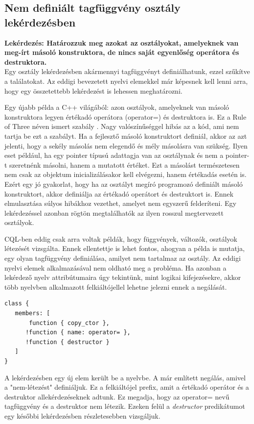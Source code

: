 \documentclass[a4paper,12pt]{report}
\begin{document}
\subsection{Nem definiált tagfüggvény osztály lekérdezésben}
\textbf{Lekérdezés: Határozzuk meg azokat az osztályokat, amelyeknek van meg-írt másoló konstruktora, de nincs saját egyenlőség operátora és destruktora.}
\\
Egy osztály lekérdezésben akármennyi tagfüggvényt definiálhatunk, ezzel szűkítve a találatokat. Az eddigi bevezetett nyelvi elemekkel már képesnek kell lenni arra, hogy egy összetettebb lekérdezést is lehessen meghatározni.
\par Egy újabb példa a C++ világából: azon osztályok, amelyeknek van másoló konstruktora legyen értékadó operátora (operator=) és destruktora is. Ez a Rule of Three néven ismert szabály \cite{rule_of_three}. Nagy valószínűséggel hibás az a kód, ami nem tartja be ezt a szabályt. Ha a fejlesztő másoló konstruktort definiál, akkor az azt jelenti, hogy a sekély másolás nem elegendő és mély másolásra van szükség. Ilyen eset például, ha egy pointer típusú adattagja van az osztálynak és nem a pointer-t szeretnénk másolni, hanem a mutatott értéket. Ezt a másolást természetesen nem csak az objektum inicializálásakor kell elvégezni, hanem értékadás esetén is. Ezért egy jó gyakorlat, hogy ha az osztályt megíró programozó definiált másoló konstruktort, akkor definiálja az értékadó operátort és destruktort is. Ennek elmulasztása súlyos hibákhoz vezethet, amelyet nem egyszerű felderíteni. Egy lekérdezéssel azonban rögtön megtalálhatók az ilyen rosszul megtervezett osztályok.
\par CQL-ben eddig csak arra voltak példák, hogy függvények, változók, osztályok létezését vizsgálta. Ennek ellentettje is lehet fontos, ahogyan a példa is mutatja, egy olyan tagfüggvény definiálása, amilyet nem tartalmaz az osztály. Az eddigi nyelvi elemek alkalmazásával nem oldható meg a probléma. Ha azonban a lekérdező nyelv attribútumaira úgy tekintünk, mint logikai kifejezésekre, akkor több nyelvben alkalmazott felkiáltójellel lehetne jelezni ennek a negálását.
\begin{verbatim}
class {
   members: [ 
       function { copy_ctor },   
      !function { name: operator= },   
      !function { destructor }
   ]
}
\end{verbatim}
\par A lekérdezésben egy új elem került be a nyelvbe. A már említett negálás, amivel a "nem-létezést" definiáljuk. Ez a felkiáltójel prefix, amit a értékadó operátor és a destruktor allekérdezéseknek  adtunk. Ez megadja, hogy az operator= nevű tagfüggvény és a destruktor nem létezik. Ezeken felül a \textit{destructor} predikátumot egy későbbi lekérdezésben részletesebben vizsgáljuk.
\end{document}
